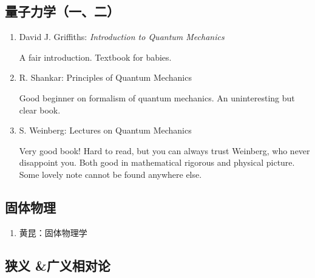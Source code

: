 \subsection*{量子力学（一、二）}

\begin{enumerate}
  \item David J. Griffiths: \textit{Introduction to Quantum Mechanics}

  A fair introduction. Textbook for babies.
  \item R. Shankar: Principles of Quantum Mechanics

  Good beginner on formalism of quantum mechanics. An uninteresting but clear book.

  \item S. Weinberg: Lectures on Quantum Mechanics

  Very good book! Hard to read, but you can always trust Weinberg, who never disappoint you. Both good in mathematical rigorous and physical picture. Some lovely note cannot be found anywhere else.
\end{enumerate}

\subsection*{固体物理}

\begin{enumerate}
  \item 黄昆：固体物理学
\end{enumerate}

\subsection*{狭义 \&广义相对论}


